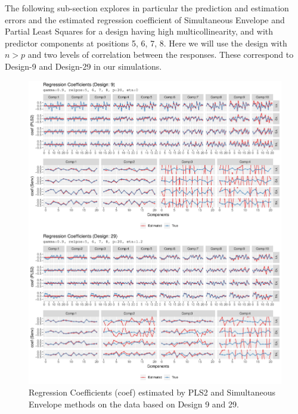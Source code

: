 \documentclass[12pt,3p,authoryear]{elsarticle}
\begin{document}
The following sub-section explores in particular the prediction and
estimation errors and the estimated regression coefficient of
Simultaneous Envelope and Partial Least Squares for a design having high
multicollinearity, and with predictor components at positions 5, 6, 7,
8. Here we will use the design with \(n>p\) and two levels of
correlation between the responses. These correspond to Design-9 and
Design-29 in our simulations.

\begin{figure}
\includegraphics[width=1\linewidth]{Images/pdf/coef-plot-1} \caption{Regression Coefficients (coef) estimated by PLS2 and Simultaneous Envelope methods on the data based on Design 9 and 29.}\label{fig:coef-plot}
\end{figure}
\end{document}
